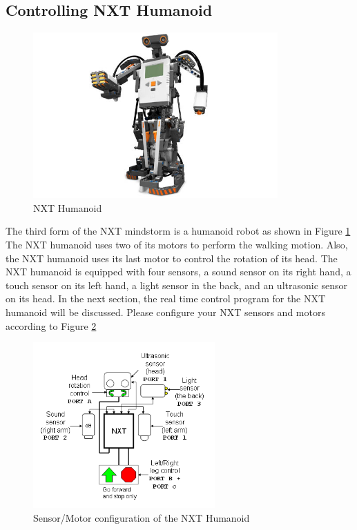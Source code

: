 \documentclass[11pt]{article}
\begin{document}
\clearpage
\newpage
\subsection{Controlling NXT Humanoid}
\begin{figure}[ht]
  \begin{center}
    \includegraphics[height=2.5in]{figure/mindstorm/NXT_humanoid.png}
    \caption{NXT Humanoid \label{fig_NXT_humanoid}}
  \end{center}
\end{figure}

The third form of the NXT mindstorm is a humanoid robot as shown in Figure \ref{fig_NXT_humanoid}
The NXT humanoid uses two of its motors to perform the walking motion. Also, the NXT humanoid uses 
its last motor to control the rotation of its head. The NXT humanoid is equipped with four sensors, 
a sound sensor on its right hand, a touch sensor on its left hand, a light sensor in the back, and 
an ultrasonic sensor on its head. In the next section, the real time control program for the NXT 
humanoid will be discussed. Please configure your NXT sensors and motors according to Figure 
\ref{fig_NXT_human_port}

\begin{figure}[ht]
  \begin{center}
    \includegraphics[height=2.5in]{figure/mindstorm/NXT_human_port.png}
    \caption{Sensor/Motor configuration of the NXT Humanoid\label{fig_NXT_human_port}}
  \end{center}
\end{figure}
\end{document}
